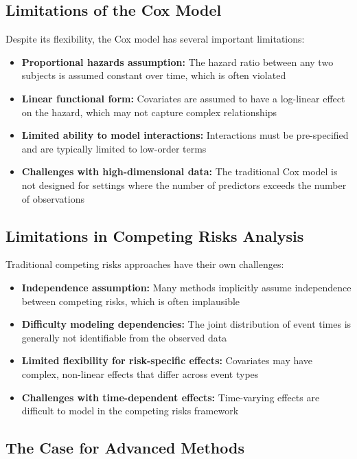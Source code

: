 \subsection{Limitations of the Cox Model}

Despite its flexibility, the Cox model has several important limitations:
\begin{itemize}
    \item \textbf{Proportional hazards assumption:} The hazard ratio between any two subjects is assumed constant over time, which is often violated
    \item \textbf{Linear functional form:} Covariates are assumed to have a log-linear effect on the hazard, which may not capture complex relationships
    \item \textbf{Limited ability to model interactions:} Interactions must be pre-specified and are typically limited to low-order terms
    \item \textbf{Challenges with high-dimensional data:} The traditional Cox model is not designed for settings where the number of predictors exceeds the number of observations
\end{itemize}

\subsection{Limitations in Competing Risks Analysis}

Traditional competing risks approaches have their own challenges:
\begin{itemize}
    \item \textbf{Independence assumption:} Many methods implicitly assume independence between competing risks, which is often implausible
    \item \textbf{Difficulty modeling dependencies:} The joint distribution of event times is generally not identifiable from the observed data
    \item \textbf{Limited flexibility for risk-specific effects:} Covariates may have complex, non-linear effects that differ across event types
    \item \textbf{Challenges with time-dependent effects:} Time-varying effects are difficult to model in the competing risks framework
\end{itemize}

\subsection{The Case for Advanced Methods}

